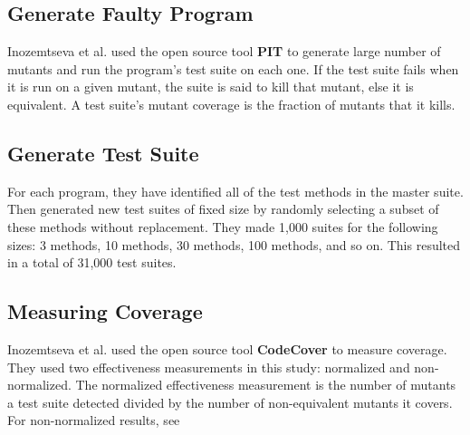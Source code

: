 \subsection{Generate Faulty Program}
Inozemtseva et al. \cite{inozemtseva2014coverage} used the open source tool \textbf{PIT} \cite{coles2016pit} to generate large number of mutants and run the program’s test suite on each one. If the test suite fails when it is run on a given mutant, the suite is said to kill that mutant, else it is equivalent. A test suite’s mutant coverage is the fraction of mutants that it kills.

\subsection{Generate Test Suite}
For each program, they have identified all of the test methods in the master suite. Then generated new test suites of fixed size by randomly selecting a subset of these methods without replacement. They made 1,000 suites for the following sizes: 3 methods, 10 methods, 30 methods, 100 methods, and so on. This resulted in a total of 31,000 test suites.

\subsection{Measuring Coverage}
Inozemtseva et al. used the open source tool \textbf{CodeCover} \cite{scheller2008codecover} to measure coverage. They used two effectiveness measurements in this study: normalized and non-normalized. The normalized effectiveness measurement is the number of mutants a test suite detected divided by the number of non-equivalent mutants it covers. For non-normalized results, see \cite{inozemtseva2014coverage}
